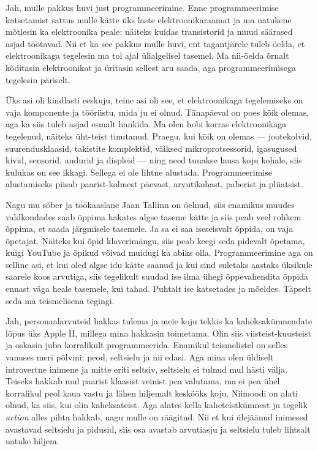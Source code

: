 
Jah, mulle pakkus huvi just programmeerimine. Enne programmeerimise katsetamist 
sattus mulle kätte üks laste 
elektroonikaraamat ja ma natukene mõtlesin ka
elektroonika peale: näiteks kuidas transistorid ja muud säärased asjad 
töötavad. 
Nii et ka see pakkus mulle huvi, ent tagantjärele tuleb öelda, et 
elektroonikaga tegelesin ma tol ajal ülialgelisel tasemel. Ma 
nii-öelda õrnalt kõditasin elektroonikat ja 
üritasin sellest aru saada, aga programmeerimisega tegelesin  
päriselt.


Üks asi oli kindlasti eeskuju, teine asi oli see, et 
elektroonikaga tegelemiseks on vaja komponente ja 
tööriistu, mida ju ei olnud. Tänapäeval on poes kõik 
olemas, aga ka siis tuleb asjad esmalt hankida. Ma olen hobi korras 
elektroonikaga tegelenud, näiteks üht-teist
tinutanud. Praegu, kui kõik on olemas --- jootekolvid, suurendusklaasid, 
takistite 
komplektid, väiksed mikroprotsessorid, igasugused kivid, sensorid, andurid 
ja displeid --- ning need tuuakse lausa koju kohale, siis kulukas on see ikkagi. 
Sellega ei ole lihtne alustada. Programmeerimise alustamiseks piisab 
paarist-kolmest päevast, arvutikohast, paberist ja pliiatsist.

Nagu mu sõber ja töökaaslane Jaan Tallinn on  
öelnud, siis enamikus muudes  
valdkondades saab õppima hakates 
algse taseme kätte ja siis peab veel rohkem õppima, et saada järgmisele 
tasemele. Ja sa ei saa iseseisvalt õppida,  
on vaja õpetajat. Näiteks kui õpid klaverimängu, siis peab keegi seda pidevalt 
õpetama, kuigi YouTube ja
õpikud võivad muidugi ka abiks olla. 
Programmeerimine aga on selline asi, et kui oled algse idu
kätte saanud ja kui sind suletaks aastaks üksikule saarele koos arvutiga, siis 
tegelikult suudad ise ilma ühegi õppevahendita õppida 
ennast väga heale tasemele, kui tahad. Puhtalt ise katsetades ja mõeldes. 
Täpselt seda ma teismelisena tegingi.


Jah, personaalarvuteid hakkas tulema ja meie koju tekkis ka kaheksakümnendate 
lõpus üks Apple 
II, millega mina hakkasin toimetama. Olin siis 
viisteist-kuusteist ja oskasin 
juba korralikult programmeerida. Enamikul teismelistel on selles vanuses meri 
põlvini: peod, seltsielu ja nii edasi. Aga mina 
olen üldiselt introvertne inimene ja mitte eriti seltsiv, seltsielu ei tulnud 
mul hästi välja. Teiseks hakkab mul 
paarist klaasist veinist pea valutama, ma ei pea 
ühel korralikul peol kaua vastu ja lähen hiljemalt 
keskööks koju. Niimoodi on alati olnud, ka siis, kui olin 
kaheksateist. Aga alates kella kaheteistkümnest ju tegelik 
\emph{action} alles pihta hakkab, nagu mulle on räägitud. Nii et kui ülejäänud 
inimesed avastavad seltsielu 
ja pidusid, siis osa avastab arvutiasju ja 
seltsielu tuleb lihtsalt natuke hiljem.

